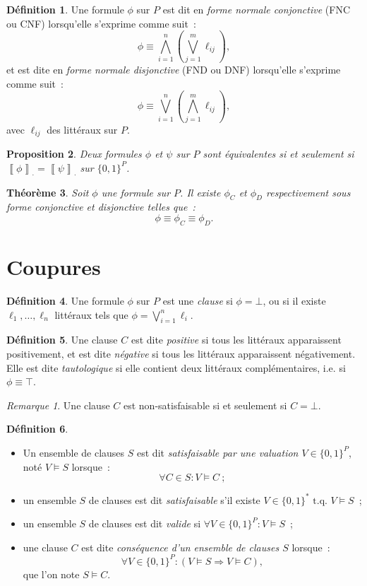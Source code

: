 \documentclass{article}
\newtheorem{thm}{Théorème}[section]
\newtheorem{prp}[thm]{Proposition}
\theoremstyle{definition}
\newtheorem{déf}[thm]{Définition}
\theoremstyle{remark}
\newtheorem*{rmq}{Remarque}
\newcommand{\logeval}[1]{\left\llbracket#1\right\rrbracket}
\newcommand{\tq}{\text{ t.q. }}
\begin{document}
	\begin{déf} Une formule $\phi$ sur $P$ est dit en \textit{forme normale conjonctive} (FNC ou CNF) lorsqu'elle s'exprime comme suit~:
	\[\phi \equiv \bigwedge_{i=1}^n\left(\bigvee_{j=1}^m\ell_{ij}\right),\]
	et est dite en \textit{forme normale disjonctive} (FND ou DNF) lorsqu'elle s'exprime comme suit~:
	\[\phi \equiv \bigvee_{i=1}^n\left(\bigwedge_{j=1}^m\ell_{ij}\right),\]
	avec $\ell_{ij}$ des littéraux sur $P$.
	\end{déf}

	\begin{prp} Deux formules $\phi$ et $\psi$ sur $P$ sont équivalentes si et seulement si $\logeval \phi_\cdot = \logeval \psi_\cdot$ sur $\{0, 1\}^P$.
	\end{prp}

	\begin{thm} Soit $\phi$ une formule sur $P$. Il existe $\phi_C$ et $\phi_D$  respectivement sous forme conjonctive et disjonctive telles que~:
	\[\phi \equiv \phi_C \equiv \phi_D.\]
	\end{thm}

\section{Coupures}
	\begin{déf} Une formule $\phi$ sur $P$ est une \textit{clause} si $\phi = \bot$, ou si il existe $\ell_1, \ldots, \ell_n$ littéraux
	tels que $\phi = \bigvee_{i=1}^n\ell_i$.
	\end{déf}

	\begin{déf} Une clause $C$ est dite \textit{positive} si tous les littéraux apparaissent positivement, et est dite \textit{négative} si tous les
	littéraux apparaissent négativement. Elle est dite \textit{tautologique} si elle contient deux littéraux complémentaires, i.e. si $\phi \equiv \top$.
	\end{déf}

	\begin{rmq} Une clause $C$ est non-satisfaisable si et seulement si $C = \bot$.
	\end{rmq}

	\begin{déf}~
	\begin{itemize}
		\item Un ensemble de clauses $S$ est dit \textit{satisfaisable par une valuation $V \in \{0, 1\}^P$}, noté $V \models S$ lorsque~:
		\[\forall C \in S : V \models C~;\]
		\item un ensemble $S$ de clauses est dit \textit{satisfaisable} s'il existe $V \in \{0, 1\}^* \tq V \models S$~;
		\item un ensemble $S$ de clauses est dit \textit{valide} si $\forall V \in \{0, 1\}^P : V \models S$~;
		\item une clause $C$ est dite \textit{conséquence d'un ensemble de clauses $S$} lorsque~:
		\[\forall V \in \{0, 1\}^P : \left(V \models S \Rightarrow V \models C\right),\]
		que l'on note $S \models C$.
	\end{itemize}
	\end{déf}
\end{document}
